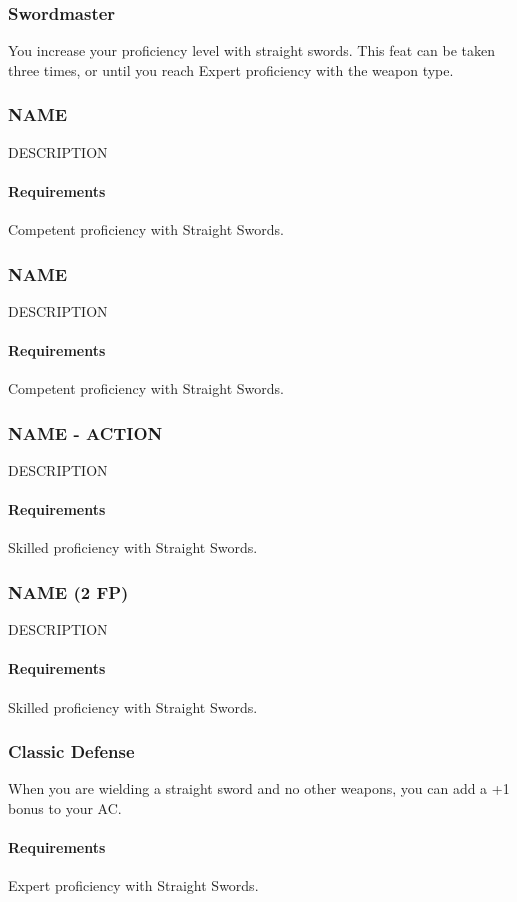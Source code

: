 \subsubsection{Swordmaster} \label{feat::swordmaster}
    You increase your proficiency level with straight swords.
    This feat can be taken three times, or until you reach Expert proficiency with the weapon type.
\subsubsection{NAME} \label{feat::name}
    DESCRIPTION
    \paragraph{Requirements} Competent proficiency with Straight Swords.
\subsubsection{NAME} \label{feat::name}
    DESCRIPTION
    \paragraph{Requirements} Competent proficiency with Straight Swords.
\subsubsection{NAME - ACTION} \label{feat::name}
    DESCRIPTION
    \paragraph{Requirements} Skilled proficiency with Straight Swords.
\subsubsection{NAME (2 FP)} \label{feat::name}
    DESCRIPTION
    \paragraph{Requirements} Skilled proficiency with Straight Swords.
\subsubsection{Classic Defense} \label{feat::classicdefense}
    When you are wielding a straight sword and no other weapons, you can add a +1 bonus to your AC.
    \paragraph{Requirements} Expert proficiency with Straight Swords.
